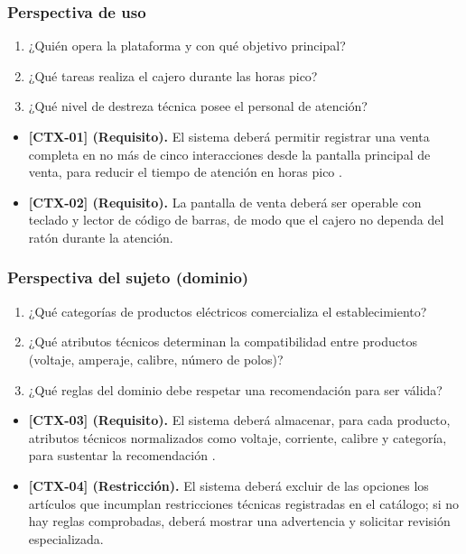 \documentclass[onecolumn,12pt,a4paper]{IEEEtran}
\begin{document}
\subsubsection{Perspectiva de uso}
\begin{enumerate}
  \item ¿Qui\'en opera la plataforma y con qu\'e objetivo principal?
  \item ¿Qu\'e tareas realiza el cajero durante las horas pico?
  \item ¿Qu\'e nivel de destreza t\'ecnica posee el personal de atenci\'on?
\end{enumerate}
\begin{itemize}
  \item \textbf{[CTX-01] (Requisito).} El sistema deber\'a permitir registrar una venta completa en no m\'as de cinco interacciones desde la pantalla principal de venta, para reducir el tiempo de atenci\'on en horas pico \cite{mavin2009,pohl2025}.
  \item \textbf{[CTX-02] (Requisito).} La pantalla de venta deber\'a ser operable con teclado y lector de c\'odigo de barras, de modo que el cajero no dependa del rat\'on durante la atenci\'on.
\end{itemize}

\subsubsection{Perspectiva del sujeto (dominio)}
\begin{enumerate}
  \item ¿Qu\'e categor\'ias de productos el\'ectricos comercializa el establecimiento?
  \item ¿Qu\'e atributos t\'ecnicos determinan la compatibilidad entre productos (voltaje, amperaje, calibre, n\'umero de polos)?
  \item ¿Qu\'e reglas del dominio debe respetar una recomendaci\'on para ser v\'alida?
\end{enumerate}
\begin{itemize}
  \item \textbf{[CTX-03] (Requisito).} El sistema deber\'a almacenar, para cada producto, atributos t\'ecnicos normalizados como voltaje, corriente, calibre y categor\'ia, para sustentar la recomendaci\'on \cite{pohl2025}.
  \item \textbf{[CTX-04] (Restricci\'on).} El sistema deber\'a excluir de las opciones los art\'iculos que incumplan restricciones t\'ecnicas registradas en el cat\'alogo; si no hay reglas comprobadas, deber\'a mostrar una advertencia y solicitar revisi\'on especializada.
\end{itemize}
\end{document}

